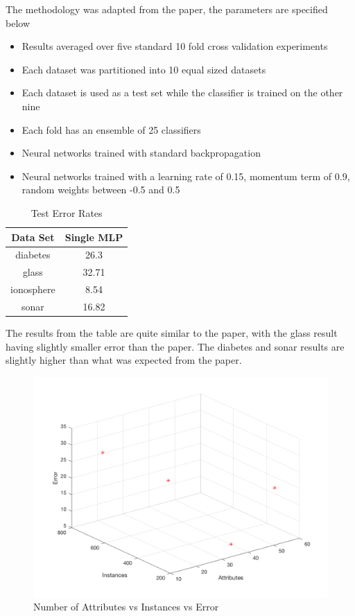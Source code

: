 The methodology was adapted from the paper, the parameters are specified below
\begin{itemize}
	\item Results averaged over five standard 10 fold cross validation experiments
	\item Each dataset was partitioned into 10 equal sized datasets
	\item Each dataset is used as a test set while the classifier is trained on the other nine
	\item Each fold has an ensemble of 25 classifiers
	\item Neural networks trained with standard backpropagation
	\item Neural networks trained with a learning rate of 0.15, momentum term of 0.9, random weights between -0.5 and 0.5
\end{itemize}

\begin{table}[H]
\centering
\caption{Test Error Rates}
\begin{tabular}{|c|c|}
\hline
Data Set & Single MLP \\
\hline
diabetes & 26.3 \\
glass & 32.71 \\
ionosphere & 8.54 \\
sonar & 16.82 \\
\hline
\end{tabular}
\end{table}

The results from the table are quite similar to the paper, with the glass result having slightly smaller error than the paper.
The diabetes and sonar results are slightly higher than what was expected from the paper.

\begin{figure}[H]
	\centering
	\caption{Number of  Attributes vs Instances vs Error}
	\includegraphics[width=\linewidth]{images/q9_5}
\end{figure}

